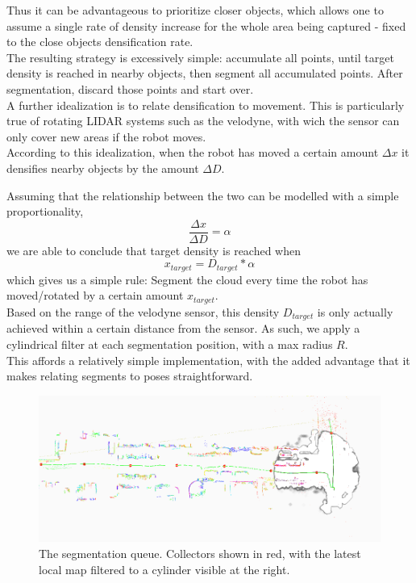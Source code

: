 Thus it can be advantageous to prioritize closer objects, which allows one to assume a single rate of density increase for the whole area being captured - fixed to the close objects densification rate.\\

The resulting strategy is excessively simple: accumulate all points, until target density is reached in nearby objects, then segment all accumulated points. After segmentation, discard those points and start over.\\

A further idealization is to relate densification to movement. This is particularly true of rotating LIDAR systems such as the velodyne, with wich the sensor can only cover new areas if the robot moves.\\

According to this idealization, when the robot has moved a certain amount $\Delta x$ it densifies nearby objects by the amount $\Delta D$.

Assuming that the relationship between the two can be modelled with a simple proportionality,
$$\frac{\Delta x}{\Delta D} = \alpha$$
we are able to conclude that target density is reached when
$$x_{target} = D_{target} * \alpha$$
which gives us a simple rule: Segment the cloud every time the robot has moved/rotated by a certain amount $x_{target}$.\\

Based on the range of the velodyne sensor, this density $D_{target}$ is only actually achieved within a certain distance from the sensor. As such, we apply a cylindrical filter at each segmentation position, with a max radius $R$.\\

This affords a relatively simple implementation, with the added advantage that it makes relating segments to poses straightforward.\\



\begin{figure}
  \centering
  \includegraphics[width=5.2in]{images/seg_queue.png}
  \caption{The segmentation queue. Collectors shown in red, with the latest local map filtered to a cylinder visible at the right.}
  \label{fig:seg-queue}
\end{figure}

